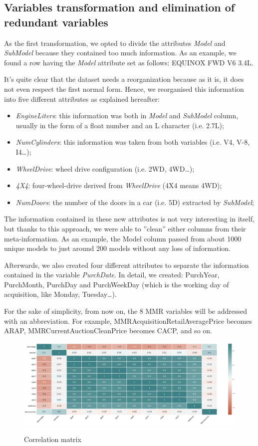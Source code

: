 \documentclass{article}
\begin{document}
	\subsection{Variables transformation and elimination of redundant variables}
	As the first transformation, we opted to divide the attributes \emph{Model} and \emph{SubModel} because they contained too much information. As an example, we found a row having the \emph{Model} attribute set as follows: EQUINOX FWD V6 3.4L. 
	
	It's quite clear that the dataset needs a reorganization because as it is, it does not even respect the first normal form. Hence, we reorganised this information into five different attributes as explained hereafter:
	\begin{itemize}
		\item \emph{EngineLiters}: this information was both in \emph{Model} and \emph{SubModel} column, usually in the form of a float number and an L character (i.e. 2.7L);
		\item \emph{NumCylinders}: this information was taken from both variables (i.e. V4, V-8, I4\dots);
		\item \emph{WheelDrive}: wheel drive configuration (i.e. 2WD, 4WD\dots);
		\item \emph{4X4}: four-wheel-drive derived from \emph{WheelDrive} (4X4 means 4WD);
		\item \emph{NumDoors}: the number of the doors in a car (i.e. 5D) extracted by \emph{SubModel};
	\end{itemize}
	
	The information contained in these new attributes is not very interesting in itself, but thanks to this approach, we were able to ”clean” either columns from their meta-information. As an example, the Model column passed from about 1000 unique models to just around 200 models without any loss of information. 
	
	Afterwards, we also created four different attributes to separate the information contained in the variable \emph{PurchDate}. In detail, we created: PurchYear, PurchMonth, PurchDay and PurchWeekDay (which is the working day of acquisition, like Monday, Tuesday\dots).
	
	For the sake of simplicity, from now on, the 8 MMR variables will be addressed with an abbreviation. For example, MMRAcquisitionRetailAveragePrice becomes ARAP, MMRCurrentAuctionCleanPrice becomes CACP, and so on.
	
	
	\begin{figure}[H]
		\centering
		{\includegraphics[width=\textwidth]{corr.png}}
		\caption{{ Correlation matrix }}
		\label{fig:corr}
	\end{figure}
	
\end{document}
